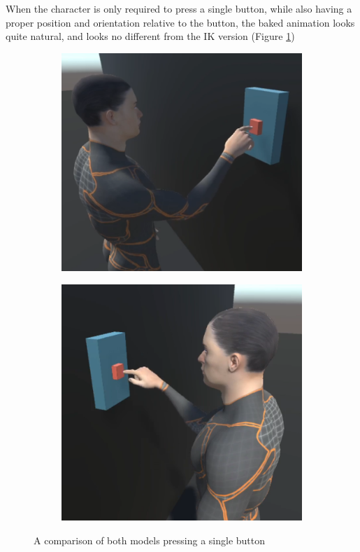 When the character is only required to press a single button, while also having
a proper position and orientation relative to the button, the baked animation
looks quite natural, and looks no different from the IK version (Figure
\ref{fig:h_single})

\begin{figure}[h!]
    \centering
    \captionsetup{justification=centering}
    \begin{subfigure}{0.4\textwidth}
        \includegraphics[width=\linewidth]{grafika/h_b_single.png}
    \end{subfigure}
    \begin{subfigure}{0.4\textwidth}
        \includegraphics[width=\linewidth]{grafika/h_ik_single.png}
    \end{subfigure}
    \caption{A comparison of both models pressing a single button}
    \label{fig:h_single}
\end{figure}

